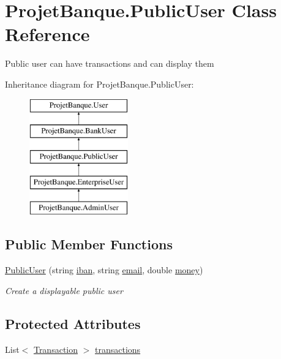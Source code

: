 \hypertarget{class_projet_banque_1_1_public_user}{}\section{Projet\+Banque.\+Public\+User Class Reference}
\label{class_projet_banque_1_1_public_user}


Public user can have transactions and can display them  


Inheritance diagram for Projet\+Banque.\+Public\+User\+:\begin{figure}[H]
\begin{center}
\leavevmode
\includegraphics[height=5.000000cm]{class_projet_banque_1_1_public_user}
\end{center}
\end{figure}
\subsection*{Public Member Functions}
\begin{DoxyCompactItemize}
\item 
\mbox{\hyperlink{class_projet_banque_1_1_public_user_adf4888fd1d26af87eb50f1c7beb0d212}{Public\+User}} (string \mbox{\hyperlink{class_projet_banque_1_1_user_a52d4f7f22889d33e196357127ceb3ec3}{iban}}, string \mbox{\hyperlink{class_projet_banque_1_1_user_a7ee066f61ff3a59b05f003709548428a}{email}}, double \mbox{\hyperlink{class_projet_banque_1_1_bank_user_a070a143e326a9bec28b4123a8e0e7d8f}{money}})
\begin{DoxyCompactList}\small\item\em Create a displayable public user \end{DoxyCompactList}\end{DoxyCompactItemize}
\subsection*{Protected Attributes}
\begin{DoxyCompactItemize}
\item 
List$<$ \mbox{\hyperlink{class_projet_banque_1_1_transaction}{Transaction}} $>$ \mbox{\hyperlink{class_projet_banque_1_1_public_user_a83b7c0cb14b060d2e58d179af8bb4e54}{transactions}}
\end{DoxyCompactItemize}
